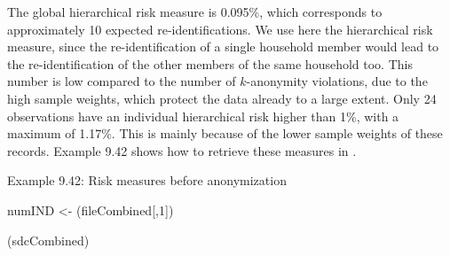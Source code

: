 \documentclass[letterpaper,10pt,english]{sphinxmanual}
\begin{document}
The global hierarchical risk measure is 0.095\%, which corresponds to
approximately 10 expected re-identifications. We use here the
hierarchical risk measure, since the re-identification of a single
household member would lead to the re-identification of the other
members of the same household too. This number is low compared to the
number of \(k\)-anonymity violations, due to the high sample
weights, which protect the data already to a large extent. Only 24
observations have an individual hierarchical risk higher than 1\%, with a
maximum of 1.17\%. This is mainly because of the lower sample weights of
these records. Example 9.42 shows how to retrieve these measures in .

Example 9.42: Risk measures before anonymization

numIND \textless{}- (fileCombined{[},1{]}) 

\begin{DUlineblock}{0em}
\item[] 
\item[] (sdcCombined)
\end{DUlineblock}

\begin{DUlineblock}{0em}
\item[] 
\item[] \sphinxcode{\sphinxupquote{\#\#}}
\item[] 
\item[] 
\item[] 
\item[] \sphinxcode{\sphinxupquote{\#\#}}
\item[] 
\item[] 
\item[] 
\item[] \sphinxcode{\sphinxupquote{\#\# -{-}-{-}-{-}-{-}-{-}-{-}-{-}-{-}-{-}-{-}-{-}-{-}-{-}-{-}-{-}-{-}-{-}-{-}-{-}-{-}-{-}-{-}-{-}-{-}-{-}-{-}-{-}-{-}-{-}-{-}-{-}-{-}-{-}-{-}-{-}-{-}-{-}-}}
\end{DUlineblock}
\end{document}
